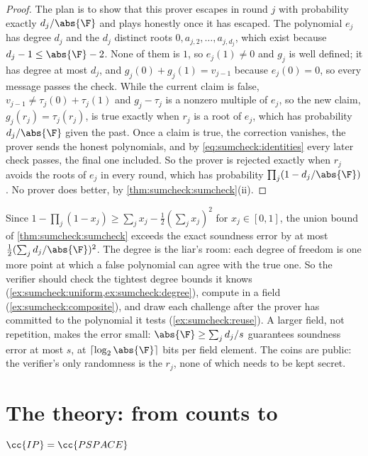 \begin{refsection}
\begin{proof}
The plan is to show that this prover escapes in round $j$ with probability exactly $d_j/\abs{\F}$ and plays honestly once it has escaped. The polynomial $e_j$ has degree $d_j$ and the $d_j$ distinct roots $0,a_{j,2},\dots,a_{j,d_j}$, which exist because $d_j-1\le\abs{\F}-2$. None of them is $1$, so $e_j(1)\ne0$ and $g_j$ is well defined; it has degree at most $d_j$, and $g_j(0)+g_j(1)=v_{j-1}$ because $e_j(0)=0$, so every message passes the check. While the current claim is false, $v_{j-1}\ne\tau_j(0)+\tau_j(1)$ and $g_j-\tau_j$ is a nonzero multiple of $e_j$, so the new claim, $g_j(r_j)=\tau_j(r_j)$, is true exactly when $r_j$ is a root of $e_j$, which has probability $d_j/\abs{\F}$ given the past. Once a claim is true, the correction vanishes, the prover sends the honest polynomials, and by \eqref{eq:sumcheck:identities} every later check passes, the final one included. So the prover is rejected exactly when $r_j$ avoids the roots of $e_j$ in every round, which has probability $\prod_j(1-d_j/\abs{\F})$. No prover does better, by \cref{thm:sumcheck:sumcheck}(ii).
\end{proof}

Since $1-\prod_j(1-x_j)\ge\sum_jx_j-\frac12(\sum_jx_j)^2$ for $x_j\in[0,1]$, the union bound of \cref{thm:sumcheck:sumcheck} exceeds the exact soundness error by at most $\frac12(\sum_jd_j/\abs{\F})^2$. The degree is the liar's room: each degree of freedom is one more point at which a false polynomial can agree with the true one. So the verifier should check the tightest degree bounds it knows (\cref{ex:sumcheck:uniform,ex:sumcheck:degree}), compute in a field (\cref{ex:sumcheck:composite}), and draw each challenge after the prover has committed to the polynomial it tests (\cref{ex:sumcheck:reuse}). A larger field, not repetition, makes the error small: $\abs{\F}\ge\sum_jd_j/s$ guarantees soundness error at most $s$, at $\lceil\log_2\abs{\F}\rceil$ bits per field element. The coins are public: the verifier's only randomness is the $r_j$, none of which needs to be kept secret.

\section{The theory: from counts to \texorpdfstring{$\cc{IP}=\cc{PSPACE}$}{IP = PSPACE}}\label{sec:sumcheck:count}


\end{refsection}
